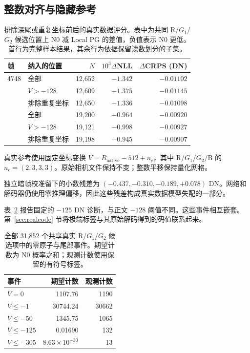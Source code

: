\documentclass[10pt,twocolumn,journal]{IEEEtran}
\begin{document}
\subsection{整数对齐与隐藏参考}
\begin{table}[t]
\centering\footnotesize
\setlength{\tabcolsep}{2.2pt}
\caption{排除深尾或重复坐标前后的真实数据评分。表中为共同 R/$G_1$/$G_2$ 候选位置上 N0 减 Local PG 的差值，负值表示 N0 更低。首行为完整样本结果，其余行为依据保留读数划分的子集。}
\label{tab:real_robust}
\begin{tabular}{@{}llrrr@{}}
\toprule
帧 & 纳入的位置 & $N$ & $10^3\Delta$NLL & $\Delta$CRPS (DN)\\
\midrule
4748 & 全部 & 12,652 & $-1.342$ & $-0.01102$\\
 & $V>-128$ & 12,609 & $-1.375$ & $-0.01145$\\
 & 排除重复坐标 & 12,650 & $-1.336$ & $-0.01098$\\
\addlinespace[2pt]
4749 & 全部 & 19,200 & $-0.964$ & $-0.00920$\\
 & $V>-128$ & 19,121 & $-0.998$ & $-0.00927$\\
 & 排除重复坐标 & 19,198 & $-0.945$ & $-0.00907$\\
\bottomrule
\end{tabular}
\end{table}

真实参考使用固定坐标变换 $V=R_{\mathrm{native}}-512+n_c$，其中 R/$G_1$/$G_2$/B 的 $n_c=(2,3,3,3)$。原始相机文件保持不变；整数平移保持量化网格。

独立暗帧校准留下的小数残差为 $(-0.437,-0.310,-0.189,+0.078)$ DN。网络和解码器仍使用零推理偏移，因此这些残差构成真实数据模型失配的一部分。

表~\ref{tab:tail_original} 报告固定的 $-125$ DN 诊断，与正文 $-128$ 阈值不同。这些事件相互嵌套。第~\ref{sec:realcode} 节将极端标签与其原始解码得到的码值联系起来。

\begin{table}[t]
\centering
\caption{全部 31,852 个共享真实 R/$G_1$/$G_2$ 候选项中的零原子与尾部事件。期望计数为 N0 概率之和；观测计数使用保留的有符号标签。}
\label{tab:tail_original}
\begin{tabular}{@{}lrr@{}}
\toprule
事件 & 期望计数 & 观测计数\\
\midrule
$V=0$ & 1107.76 & 1190\\
$V\leq-1$ & 30744.24 & 30662\\
$V\leq-50$ & 1345.75 & 1065\\
$V\leq-125$ & 0.01690 & 132\\
$V\leq-305$ & $8.63\times10^{-30}$ & 13\\
\bottomrule
\end{tabular}
\end{table}
\end{document}
